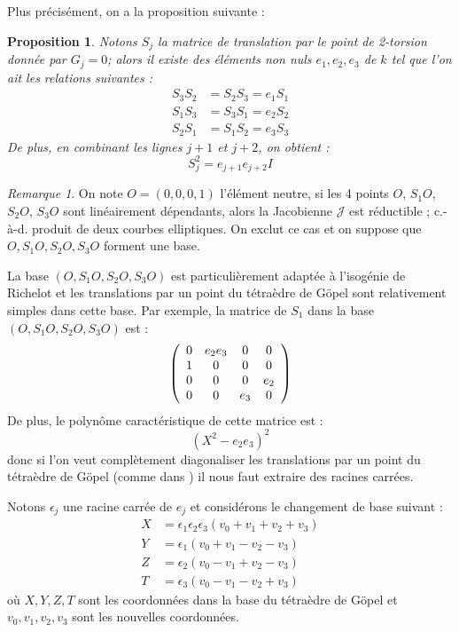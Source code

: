 \documentclass[a4paper]{article}
\newtheorem{proposition}[theoreme]{Proposition}
\theoremstyle{definition}
\theoremstyle{remark}
\newtheorem{remarque}{Remarque}
\numberwithin{equation}{section}
\begin{document}
Plus précisément, on a la proposition suivante :

\begin{proposition}
Notons $S_j$ la matrice de translation par le point de 2-torsion donnée par $G_j=0$; alors il existe des éléments non nuls $e_1,e_2,e_3$ de $k$ tel que l'on ait les relations suivantes :
\begin{align}
S_3S_2 &= S_2S_3 = e_1S_1 \\
S_1S_3 &= S_3S_1 = e_2S_2 \\
S_2S_1 &= S_1S_2 = e_3S_3
\end{align}
De plus, en combinant les lignes $j+1$ et $j+2$, on obtient :
$$S_j^2 = e_{j+1}e_{j+2}I$$
\end{proposition}

\begin{remarque}
On note $O=(0,0,0,1)$ l'élément neutre, si les 4 points $O$, $S_1O$, $S_2O$, $S_3O$ sont linéairement dépendants, alors la Jacobienne $\mathcal{J}$ est réductible \citep{cassels-Flynn}; c.-à-d. produit de deux courbes elliptiques. On exclut ce cas et on suppose que $O,S_1O,S_2O,S_3O$ forment une base.
\end{remarque}

La base $(O,S_1O,S_2O,S_3O)$ est particulièrement adaptée à l'isogénie de Richelot et les translations par un point du tétraèdre de G\"opel sont relativement simples dans cette base. Par exemple, la matrice de $S_1$ dans la base  $(O,S_1O,S_2O,S_3O)$ est :
\[ \left(
  \begin{array}{ c c c c}
     0 & e_2e_3 & 0  & 0  \\
     1 & 0   & 0  & 0  \\
     0 & 0   & 0  & e_2 \\
     0 & 0   & e_3  & 0  \\
  \end{array} \right)
\]
De plus, le polynôme caractéristique de cette matrice est :
$$(X^2-e_2e_3)^2$$
donc si l'on veut complètement diagonaliser les translations par un point du tétraèdre de G\"opel (comme dans \citep{gaudry}) il nous faut extraire des racines carrées.

Notons $\epsilon_j$ une racine carrée de $e_j$ et considérons le changement de base suivant \citep{cassels-Flynn} :
\begin{align}
\label{chgBase}
X &= \epsilon_1\epsilon_2\epsilon_3(v_0+v_1+v_2+v_3) \\
Y &= \epsilon_1(v_0+v_1-v_2-v_3) \\
Z &= \epsilon_2(v_0-v_1+v_2-v_3) \\
T &= \epsilon_3(v_0-v_1-v_2+v_3)
\end{align}
où $X,Y,Z,T$ sont les coordonnées dans la base du tétraèdre de G\"opel et $v_0,v_1,v_2,v_3$ sont les nouvelles coordonnées.
\end{document}
